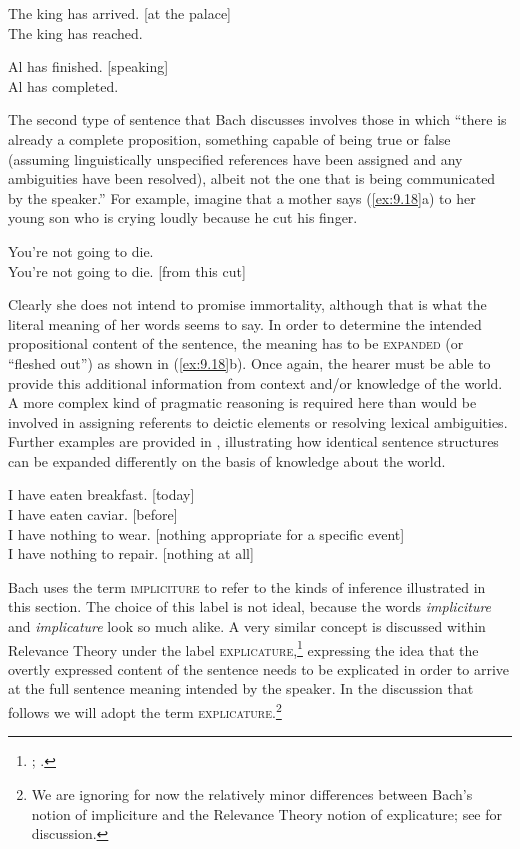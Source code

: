 \ea \label{ex:9.16}
\ea The king has arrived. [at the palace]\\
\ex *The king has reached.
                       \z
\z

\ea \label{ex:9.17}
\ea Al has finished. [speaking]\\
\ex *Al has completed.
                       \z
\z


The second type of sentence that Bach discusses involves those in which “there is already a complete proposition, something capable of being true or false (assuming linguistically unspecified references have been assigned and any ambiguities have been resolved), albeit not the one that is being communicated by the speaker.” For example, imagine that a mother says (\ref{ex:9.18}a) to her young son who is crying loudly because he cut his finger.


\ea \label{ex:9.18}
\ea You’re not going to die.\\
\ex You’re not going to die. [from this cut]
                       \z
\z


Clearly she does not intend to promise immortality, although that is what the literal meaning of her words seems to say. In order to determine the intended propositional content of the sentence, the meaning has to be \textsc{expanded} (or “fleshed out”) as shown in (\ref{ex:9.18}b). Once again, the hearer must be able to provide this additional information from context and/or knowledge of the world. A more complex kind of pragmatic reasoning is required here than would be involved in assigning referents to deictic elements or resolving lexical ambiguities. Further examples are provided in , illustrating how identical sentence structures can be expanded differently on the basis of knowledge about the world.


\ea \label{ex:9.19}
\ea I have eaten breakfast. [today]\\
\ex I have eaten caviar. [before]\\
\ex I have nothing to wear. [nothing appropriate for a specific event]\\
\ex I have nothing to repair. [nothing at all]
                       \z
\z


Bach uses the term \textsc{impliciture} to refer to the kinds of inference illustrated in this section. The choice of this label is not ideal, because the words \textit{impliciture} and \textit{implicature} look so much alike. A very similar concept is discussed within Relevance Theory under the label \textsc{explicature},\footnote{\citet{SperberWilson1986}; \citet{Carston1988}.} expressing the idea that the overtly expressed content of the sentence needs to be explicated in order to arrive at the full sentence meaning intended by the speaker. In the discussion that follows we will adopt the term \textsc{explicature}.\footnote{We are ignoring for now the relatively minor differences between Bach’s notion of impliciture and the Relevance Theory notion of explicature; see \citet{Bach2010} for discussion.}



